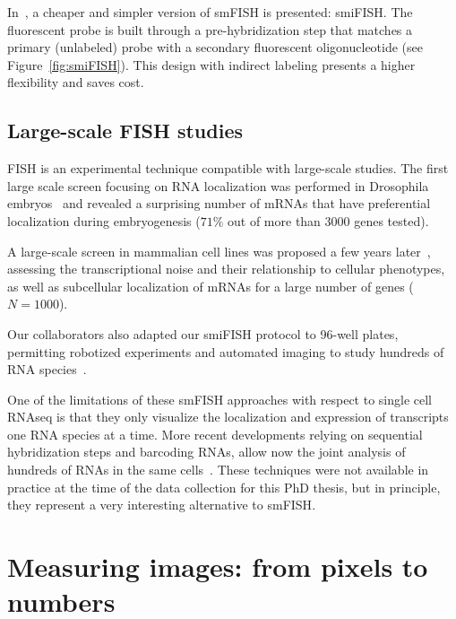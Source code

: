 In~\cite{tsanov_smifish_2016}, a cheaper and simpler version of \ac{smFISH} is presented: \ac{smiFISH}.
The fluorescent probe is built through a pre-hybridization step that matches a primary (unlabeled) probe with a secondary fluorescent oligonucleotide (see Figure~\ref{fig:smiFISH}).
This design with indirect labeling presents a higher flexibility and saves cost.

\subsection{Large-scale FISH studies}
\label{subsec:intro_scale_fish}

FISH is an experimental technique compatible with large-scale studies.
The first large scale screen focusing on RNA localization was performed in Drosophila embryos~\cite{lecuyer_global_2007} and revealed a surprising number of \ac{mRNA}s that have preferential localization during embryogenesis ($71\%$ out of more than 3000 genes tested). 

A large-scale screen in mammalian cell lines was proposed a few years later~\cite{battich_image-based_2013, battich_control_2015}, assessing the transcriptional noise and their relationship to cellular phenotypes, as well as subcellular localization of \ac{mRNA}s for a large number of genes ($N = 1000$).

Our collaborators also adapted our \ac{smiFISH} protocol to 96-well plates, permitting robotized experiments and automated imaging to study hundreds of \ac{RNA} species~\cite{tsanov_smifish_2016, safieddine_choreography_2021}.

One of the limitations of these \ac{smFISH} approaches with respect to single cell RNAseq is that they only visualize the localization and expression of transcripts one \ac{RNA} species at a time.
More recent developments relying on sequential hybridization steps and barcoding \ac{RNA}s, allow now the joint analysis of hundreds of \ac{RNA}s in the same cells~\cite{lubeck_single_cell_2014, Chen_2015, eng_seqfish_2019, fazalAtlasSubcellularRNA2019}.
These techniques were not available in practice at the time of the data collection for this PhD thesis, but in principle, they represent a very interesting alternative to \ac{smFISH}.

\section{Measuring images: from pixels to numbers}
\label{sec:computation_biology}

